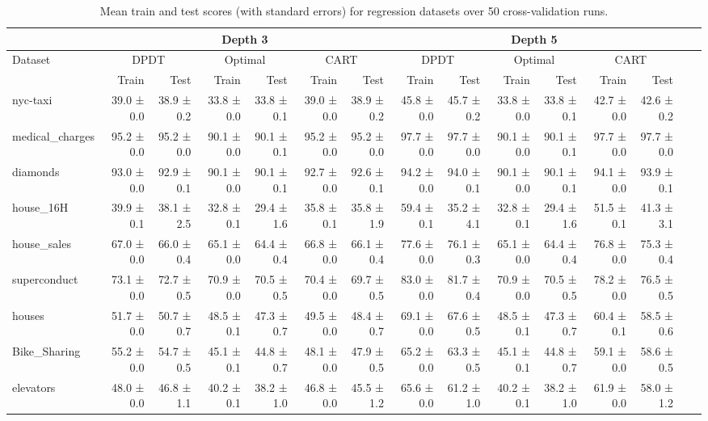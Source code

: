 \begin{table}
\centering
\footnotesize
\caption{Mean train and test scores (with standard errors) for regression datasets over 50 cross-validation runs.}\label{tab:regression}
\begin{tabular}{l|rr|rr|rr||rr|rr|rr|rr}
\hline
 & \multicolumn{6}{c||}{\textbf{Depth 3}} & \multicolumn{6}{c|}{\textbf{Depth 5}} \\ \hline
Dataset & \multicolumn{2}{c|}{DPDT} & \multicolumn{2}{c|}{Optimal} & \multicolumn{2}{c||}{CART} & \multicolumn{2}{c|}{DPDT} & \multicolumn{2}{c|}{Optimal} & \multicolumn{2}{c|}{CART} \\
 & Train & Test & Train & Test & Train & Test & Train & Test & Train & Test & Train & Test \\
\hline
nyc-taxi & 39.0 ± 0.0 & 38.9 ± 0.2 & 33.8 ± 0.0 & 33.8 ± 0.1 & 39.0 ± 0.0 & 38.9 ± 0.2 & 45.8 ± 0.0 & 45.7 ± 0.2 & 33.8 ± 0.0 & 33.8 ± 0.1 & 42.7 ± 0.0 & 42.6 ± 0.2 \\
medical\_charges & 95.2 ± 0.0 & 95.2 ± 0.0 & 90.1 ± 0.0 & 90.1 ± 0.1 & 95.2 ± 0.0 & 95.2 ± 0.0 & 97.7 ± 0.0 & 97.7 ± 0.0 & 90.1 ± 0.0 & 90.1 ± 0.1 & 97.7 ± 0.0 & 97.7 ± 0.0 \\
diamonds & 93.0 ± 0.0 & 92.9 ± 0.1 & 90.1 ± 0.0 & 90.1 ± 0.1 & 92.7 ± 0.0 & 92.6 ± 0.1 & 94.2 ± 0.0 & 94.0 ± 0.1 & 90.1 ± 0.0 & 90.1 ± 0.1 & 94.1 ± 0.0 & 93.9 ± 0.1 \\
house\_16H & 39.9 ± 0.1 & 38.1 ± 2.5 & 32.8 ± 0.1 & 29.4 ± 1.6 & 35.8 ± 0.1 & 35.8 ± 1.9 & 59.4 ± 0.1 & 35.2 ± 4.1 & 32.8 ± 0.1 & 29.4 ± 1.6 & 51.5 ± 0.1 & 41.3 ± 3.1 \\
house\_sales & 67.0 ± 0.0 & 66.0 ± 0.4 & 65.1 ± 0.0 & 64.4 ± 0.4 & 66.8 ± 0.0 & 66.1 ± 0.4 & 77.6 ± 0.0 & 76.1 ± 0.3 & 65.1 ± 0.0 & 64.4 ± 0.4 & 76.8 ± 0.0 & 75.3 ± 0.4 \\
superconduct & 73.1 ± 0.0 & 72.7 ± 0.5 & 70.9 ± 0.0 & 70.5 ± 0.5 & 70.4 ± 0.0 & 69.7 ± 0.5 & 83.0 ± 0.0 & 81.7 ± 0.4 & 70.9 ± 0.0 & 70.5 ± 0.5 & 78.2 ± 0.0 & 76.5 ± 0.5 \\
houses & 51.7 ± 0.0 & 50.7 ± 0.7 & 48.5 ± 0.1 & 47.3 ± 0.7 & 49.5 ± 0.0 & 48.4 ± 0.7 & 69.1 ± 0.0 & 67.6 ± 0.5 & 48.5 ± 0.1 & 47.3 ± 0.7 & 60.4 ± 0.1 & 58.5 ± 0.6 \\
Bike\_Sharing & 55.2 ± 0.0 & 54.7 ± 0.5 & 45.1 ± 0.1 & 44.8 ± 0.7 & 48.1 ± 0.0 & 47.9 ± 0.5 & 65.2 ± 0.0 & 63.3 ± 0.5 & 45.1 ± 0.1 & 44.8 ± 0.7 & 59.1 ± 0.0 & 58.6 ± 0.5 \\
elevators & 48.0 ± 0.0 & 46.8 ± 1.1 & 40.2 ± 0.1 & 38.2 ± 1.0 & 46.8 ± 0.0 & 45.5 ± 1.2 & 65.6 ± 0.0 & 61.2 ± 1.0 & 40.2 ± 0.1 & 38.2 ± 1.0 & 61.9 ± 0.0 & 58.0 ± 1.2 \\

\end{tabular}
\end{table}
